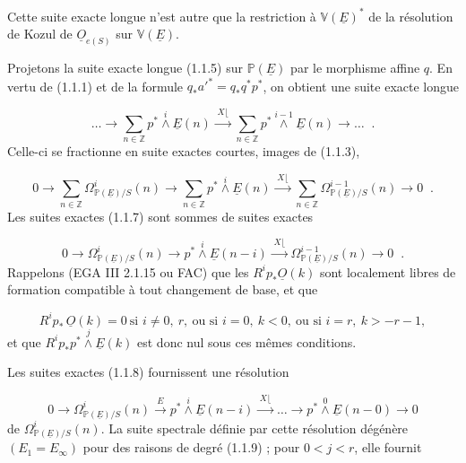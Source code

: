 
Cette suite exacte longue n'est autre que la restriction à $\mathbb{V}(\underline{E})^*$ de la résolution de Kozul de $\underline{O}_{e(S)}$ sur $\mathbb{V}(\underline{E})$.

Projetons la suite exacte longue (1.1.5) sur $\mathbb{P}(\underline{E})$ par le morphisme affine $q$. En vertu de (1.1.1) et de la formule $q_*{a'}^{*} = q_*q^*p^*$, on obtient une suite exacte longue

\begin{equation}\tag{1.1.6}
\ldots \longrightarrow \sum_{n \in \mathbb{Z}} p^* \overset{i}{\wedge} \underline{E}(n) \xrightarrow{\;X\lfloor\;} \sum_{n \in \mathbb{Z}} p^* \overset{i-1}{\wedge} \underline{E}(n) \longrightarrow \ldots \;\; .
\end{equation}
Celle-ci se fractionne en suite exactes courtes, images de (1.1.3),

\begin{equation}\tag{1.1.7}
0 \longrightarrow \sum_{n \in \mathbb{Z}} \Omega^i_{\mathbb{P}(\underline{E})/S}(n) \longrightarrow \sum_{n \in \mathbb{Z}} p^* \overset{i}{\wedge} \underline{E}(n) \xrightarrow{\;X\lfloor\;} \sum_{n \in \mathbb{Z}} \Omega^{i-1}_{\mathbb{P}(\underline{E})/S}(n) \to 0 \;\; .
\end{equation}
Les suites exactes (1.1.7) sont sommes de suites exactes

\begin{equation}\tag{1.1.8}
0 \longrightarrow \Omega^i_{\mathbb{P}(\underline{E})/S}(n) \longrightarrow p^* \overset{i}{\wedge} \underline{E}(n-i) \xrightarrow{\;X\lfloor\;} \Omega^{i-1}_{\mathbb{P}(\underline{E})/S}(n) \longrightarrow 0 \;\; .
\end{equation}
Rappelons (EGA III 2.1.15 ou FAC) que les $R^i p_* \underline{O}(k)$ sont localement libres de formation compatible à tout changement de base, et que

\begin{equation}\tag{1.1.9}
R^i p_* \, \underline{O}(k) = 0 \ \text{si } i \neq 0,\ r, \ \text{ou si } i = 0,\ k < 0, \ \text{ou si } i = r,\ k > -r-1,
\end{equation}
et que $R^i p_* p^* \overset{j}{\wedge} \underline{E}(k)$ est donc nul sous ces mêmes conditions.

Les suites exactes (1.1.8) fournissent une résolution

\begin{equation}\tag{1.1.10}
0 \longrightarrow \Omega^i_{\mathbb{P}(\underline{E})/S}(n) \xrightarrow{\;E\;} p^* \overset{i}{\wedge} \underline{E}(n-i) \xrightarrow{\;X\lfloor\;} \ldots \longrightarrow p^* \overset{0}{\wedge} \underline{E}(n-0) \longrightarrow 0
\end{equation}
de $\Omega^i_{\mathbb{P}(\underline{E})/S}(n)$. La suite spectrale définie par cette résolution dégénère $(E_1 = E_\infty)$ pour des raisons de degré (1.1.9) ; pour $0 < j < r$, elle fournit

